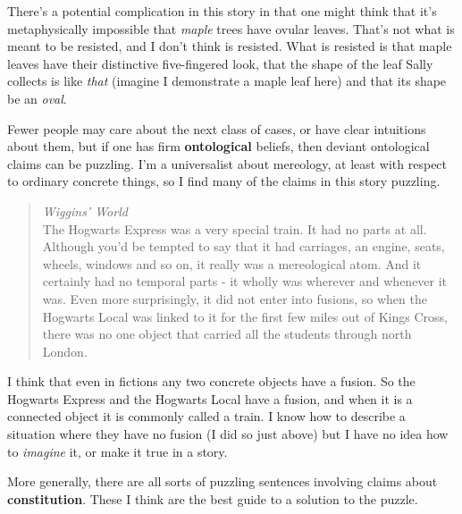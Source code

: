 \noindent There's a potential complication in this story in that one might think that it's metaphysically impossible that \textit{maple} trees have ovular leaves. That's not what is meant to be resisted, and I don't think is resisted. What is resisted is that maple leaves have their distinctive five-fingered look, that the shape of the leaf Sally collects is like \textit{that} (imagine I demonstrate a maple leaf here) and that its shape be an \textit{oval}.

Fewer people may care about the next class of cases, or have clear intuitions about them, but if one has firm \textbf{ontological} beliefs, then deviant ontological claims can be puzzling. I'm a universalist about mereology, at least with respect to ordinary concrete things, so I find many of the claims in this story puzzling.

\begin{quote}
\textit{Wiggins' World} \\
The Hogwarts Express was a very special train. It had no parts at all. Although you'd be tempted to say that it had carriages, an engine, seats, wheels, windows and so on, it really was a mereological atom. And it certainly had no temporal parts - it wholly was wherever and whenever it was. Even more surprisingly, it did not enter into fusions, so when the Hogwarts Local was linked to it for the first few miles out of Kings Cross, there was no one object that carried all the students through north London.
\end{quote}

\noindent I think that even in fictions any two concrete objects have a fusion. So the Hogwarts Express and the Hogwarts Local have a fusion, and when it is a connected object it is commonly called a train. I know how to describe a situation where they have no fusion (I did so just above) but I have no idea how to \textit{imagine} it, or make it true in a story.

More generally, there are all sorts of puzzling sentences involving claims about \textbf{constitution}. These I think are the best guide to a solution to the puzzle. 

